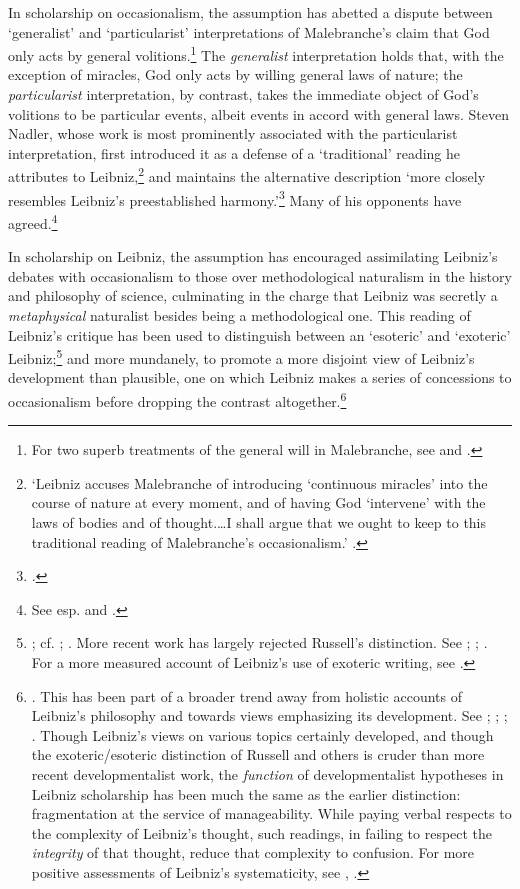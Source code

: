 \documentclass{article}
\begin{document}
In scholarship on occasionalism, the assumption has abetted a dispute between `generalist' and `particularist' interpretations of Malebranche's claim that God only acts by general volitions.\footnote{For two superb treatments of the general will in Malebranche, see \autocite{Schmaltz2008} and \autocite{Wahl2011}.} The \emph{generalist} interpretation holds that, with the exception of miracles, God only acts by willing general laws of nature; the \emph{particularist} interpretation, by contrast, takes the immediate object of God's volitions to be particular events, albeit events in accord with general laws. Steven Nadler, whose work is most prominently associated with the particularist interpretation, first introduced it as a defense of a `traditional' reading he attributes to Leibniz,\footnote{`Leibniz accuses Malebranche of introducing `continuous miracles' into the course of nature at every moment, and of having God `intervene' with the laws of bodies and of thought.\ldots I shall argue that we ought to keep to this traditional reading of Malebranche's occasionalism.' \autocite[32]{Nadler1993}.} and maintains the alternative description `more closely resembles Leibniz's preestablished harmony.'\footnote{\autocite[31]{Nadler1993}.} Many of his opponents have agreed.\footnote{See esp. \autocite{Clarke1995} and \autocite{Scott1997}.}

In scholarship on Leibniz, the assumption has encouraged assimilating Leibniz's debates with occasionalism to those over methodological naturalism in the history and philosophy of science, culminating in the charge that Leibniz was secretly a \emph{metaphysical} naturalist besides being a methodological one. This reading of Leibniz's critique has been used to distinguish between an `esoteric' and `exoteric' Leibniz;\footnote{\autocite{Russell1951}; cf. \autocite{Shields1986}; \autocite[277-281]{Wilson1989}. More recent work has largely rejected Russell's distinction. See \autocite[4-9]{Mercer2001}; \autocite[420-426]{Rateau2008}; \autocite{Antognazza2009}. For a more measured account of Leibniz's use of exoteric writing, see \autocite{Whipple2015}.} and more mundanely, to promote a more disjoint view of Leibniz's development than plausible, one on which Leibniz makes a series of concessions to occasionalism before dropping the contrast altogether.\footnote{\autocite{Scott1997}. This has been part of a broader trend away from holistic accounts of Leibniz's philosophy and towards views emphasizing its development. See \autocite[373]{Wilson1999}; \autocite[78]{Garber2008}; \autocite[388]{Garber2009}; \autocite[223-232]{Garber2014}. Though Leibniz's views on various topics certainly developed, and though the exoteric/esoteric distinction of Russell and others is cruder than more recent developmentalist work, the \emph{function} of developmentalist hypotheses in Leibniz scholarship has been much the same as the earlier distinction: fragmentation at the service of manageability. While paying verbal respects to the complexity of Leibniz's thought, such readings, in failing to respect the \emph{integrity} of that thought, reduce that complexity to confusion. For more positive assessments of Leibniz's systematicity, see \autocite{Rescher1981}, \autocite{Goldenbaum2002}.}
\end{document}
